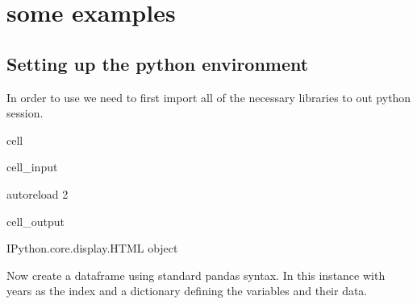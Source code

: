 \documentclass[letterpaper,10pt,english]{jupyterBook}
\begin{document}
\section{ some examples}
\label{\detokenize{content/04_PythonEssentials/UpdateCommand:upd-some-examples}}

\subsection{Setting up the python environment}
\label{\detokenize{content/04_PythonEssentials/UpdateCommand:setting-up-the-python-environment}}
\sphinxAtStartPar
In order to use  we need to first import all of the necessary libraries to out python session.

\begin{sphinxuseclass}{cell}\begin{sphinxVerbatimInput}

\begin{sphinxuseclass}{cell_input}
\begin{sphinxVerbatim}[commandchars=\\\{\}]
 autoreload
 2

   

    
\end{sphinxVerbatim}

\end{sphinxuseclass}\end{sphinxVerbatimInput}
\begin{sphinxVerbatimOutput}

\begin{sphinxuseclass}{cell_output}
\begin{sphinxVerbatim}[commandchars=\\\{\}]
\PYGZlt{}IPython.core.display.HTML object\PYGZgt{}
\end{sphinxVerbatim}

\end{sphinxuseclass}\end{sphinxVerbatimOutput}

\end{sphinxuseclass}
\sphinxAtStartPar
Now create a dataframe using standard pandas syntax.  In this instance with years as the index and a dictionary defining the variables and their data.
\end{document}
